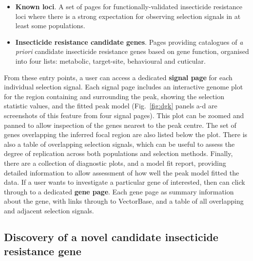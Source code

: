 \begin{refsection}
\begin{itemize}
    \item \textbf{Known loci}.
    A set of pages for functionally-validated insecticide resistance loci where there is a strong expectation for observing selection signals in at least some populations.
    \item \textbf{Insecticide resistance candidate genes}.
    Pages providing catalogues of \textit{a priori} candidate insecticide resistance genes based on gene function, organised into four lists: metabolic, target-site, behavioural and cuticular.
\end{itemize}


From these entry points, a user can access a dedicated \textbf{signal page} for each individual selection signal.
%
Each signal page includes an interactive genome plot for the region containing and surrounding the peak, showing the selection statistic values, and the fitted peak model (Fig.~\ref{fig:dgk} panels a-d are screenshots of this feature from four signal pages).
%
This plot can be zoomed and panned to allow inspection of the genes nearest to the peak centre.
%
The set of genes overlapping the inferred focal region are also listed below the plot.
%
There is also a table of overlapping selection signals, which can be useful to assess the degree of replication across both populations and selection methods.
%
Finally, there are a collection of diagnostic plots, and a model fit report, providing detailed information to allow assessment of how well the peak model fitted the data.
%
If a user wants to investigate a particular gene of interested, then can click through to a dedicated \textbf{gene page}.
%
Each gene page as summary information about the gene, with links through to VectorBase, and a table of all overlapping and adjacent selection signals.



\subsection{Discovery of a novel candidate insecticide resistance gene}\label{subsec:novel}



\end{refsection}
